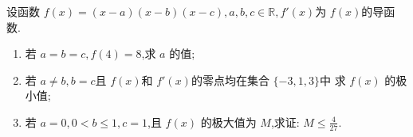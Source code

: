 \documentclass[class=ctexart,crop=false]{standalone}
\begin{document}
设函数 $f(x)=(x-a)(x-b)(x-c),a,b,c\in \mathbb{R},f'(x)$为 $f(x)$的导函数.
\begin{enumerate}[label=(\arabic*)]
    \item 若 $a=b=c,f(4)=8$,求 $a$ 的值;
    \item 若 $a \neq b,b=c$且 $f(x)$和 $f'(x)$的零点均在集合 $\{-3,1,3\} $中
    求 $f(x)$ 的极小值;
    \item 若 $a=0,0<b\leqslant 1,c=1$,且 $f(x)$ 的极大值为 $M$,求证: $M \leqslant 
    \frac{4}{27}$.
\end{enumerate}
\end{document}
